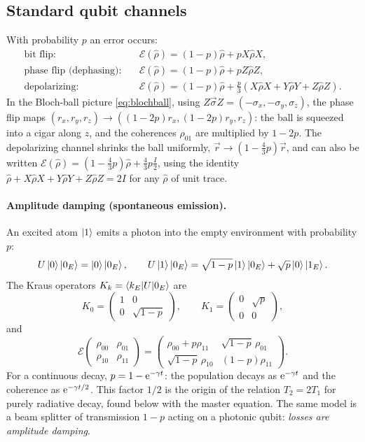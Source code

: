 \subsection{Standard qubit channels}
With probability $p$ an error occurs:
\begin{align}
  \text{bit flip:}&\quad\mathcal E(\hat\rho)=(1-p)\hat\rho+pX\hat\rho X,\\
  \text{phase flip (dephasing):}&\quad\mathcal E(\hat\rho)=(1-p)\hat\rho+pZ\hat\rho Z,\\
  \text{depolarizing:}&\quad\mathcal E(\hat\rho)=(1-p)\hat\rho+\tfrac p3\left(X\hat\rho X+Y\hat\rho Y+Z\hat\rho Z\right).
\end{align}
In the Bloch-ball picture \cref{eq:blochball}, using $Z\vec\sigma Z=(-\sigma_x,-\sigma_y,\sigma_z)$, the phase flip maps $(r_x,r_y,r_z)\to((1-2p)r_x,(1-2p)r_y,r_z)$: the ball
is squeezed into a cigar along $z$, and the coherences $\rho_{01}$ are multiplied by $1-2p$. The depolarizing channel shrinks the ball uniformly, $\vec r\to(1-\frac43p)\vec r$,
and can also be written $\mathcal E(\hat\rho)=(1-\frac43p)\hat\rho+\frac43p\frac I2$, using the identity $\hat\rho+X\hat\rho X+Y\hat\rho Y+Z\hat\rho Z=2I$ for any $\hat\rho$ of unit trace.

\paragraph{Amplitude damping (spontaneous emission).} An excited atom $\left|1\right\rangle$ emits a photon into the empty environment with probability $p$:
\begin{equation}
  U\left|0\right\rangle\left|0_E\right\rangle=\left|0\right\rangle\left|0_E\right\rangle,\qquad U\left|1\right\rangle\left|0_E\right\rangle=\sqrt{1-p}\left|1\right\rangle\left|0_E\right\rangle+\sqrt p\left|0\right\rangle\left|1_E\right\rangle.
\end{equation}
The Kraus operators $K_k=\left\langle k_E\middle|U\middle|0_E\right\rangle$ are
\begin{equation}
  K_0=\begin{pmatrix}1&0\\0&\sqrt{1-p}\end{pmatrix},\qquad K_1=\begin{pmatrix}0&\sqrt p\\0&0\end{pmatrix},
\end{equation}
and
\begin{equation}
  \mathcal E\begin{pmatrix}\rho_{00}&\rho_{01}\\ \rho_{10}&\rho_{11}\end{pmatrix}=\begin{pmatrix}\rho_{00}+p\rho_{11}&\sqrt{1-p}\,\rho_{01}\\ \sqrt{1-p}\,\rho_{10}&(1-p)\rho_{11}\end{pmatrix}.
\end{equation}
For a continuous decay, $p=1-\mathrm e^{-\gamma t}$: the population decays as $\mathrm e^{-\gamma t}$ and the coherence as $\mathrm e^{-\gamma t/2}$. This factor $1/2$ is the origin of the relation
$T_2=2T_1$ for purely radiative decay, found below with the master equation. The same model is a beam splitter of transmission $1-p$ acting on a photonic qubit: \emph{losses
are amplitude damping}.

